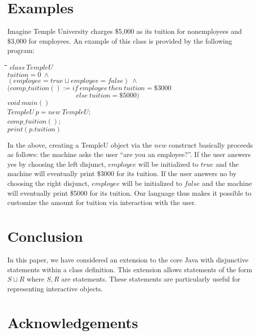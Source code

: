 \documentclass[letter]{ieice}
\newenvironment{exmple}{
 \begingroup \begin{tabbing} \hspace{2em}\= \hspace{3em}\= \hspace{3em}\=
\hspace{3em}\= \hspace{3em}\= \hspace{3em}\= \kill}{
 \end{tabbing}\endgroup}
\newcommand{\add}{\sqcup} \newcommand{\adc}{\&} \newcommand{\Cscr}{{\cal C}}
\begin{document}
\section{Examples}\label{sec:modules}

Imagine Temple University charges \$5,000 as its tuition for nonemployees
and \$3,000 for employees.
An example of this class is provided by the
following program:


\begin{exmple}
 $class\ TempleU$\\
$tuition = 0\ \land$ \\
$(employee = true \add employee = false)\ \land$\\
$(comp\_tuition() :=  if\ employee\, then\ tuition = \$3000\ $\\
$ \hspace{10em} else\ tuition = \$5000) $\\
$void\ main()$\\
$TempleU\ p = new\ TempleU$; \\
$comp\_tuition()$;\\
$print(p.tuition)$
\end{exmple}
\noindent In the above, creating a TempleU object via the $new$ construct
 basically proceeds as follows: the machine asks the user ``are you an employee?''.
If the user answers yes by choosing the left disjunct, $employee$ will be initialized to
$true$ and the machine will eventually print \$3000 for its tuition.
 If the user answers no by choosing the right disjunct,  $employee$  will be initialized
 to $false$ and the machine will eventually print \$5000 for its tuition.
Our language thus makes it possible to customize the amount for tuition via
interaction with the user.



\section{Conclusion}\label{sec:conc}

In this paper, we have considered an extension to the core Java with
disjunctive statements within a class definition. This extension allows statements of
the form  $S \add R$  where $S, R$ are statements.
These statements are
 particularly useful for representing interactive objects.




\section{Acknowledgements}
\end{document}
